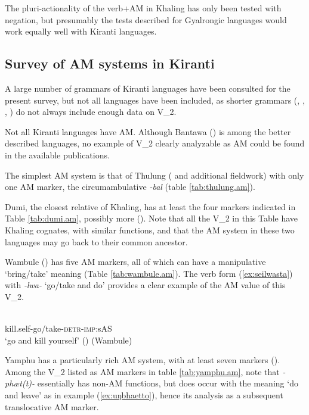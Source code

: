 \documentclass[oneside,a4paper,11pt]{article}
\newcommand{\ipa}[1]{{\phon\textit{#1}}}
\newcommand{\sens}[1]{‘#1’}
\newcommand{\rouge}[1]{{\color{red}#1}}
\begin{document}
 

The pluri-actionality of the verb+AM in Khaling has only been tested with negation, but presumably the tests described for Gyalrongic languages would work equally well with Kiranti languages.

\subsection{Survey of AM systems in Kiranti}

A large number of grammars of Kiranti languages have been consulted for the present survey, but not all languages have been included, as shorter grammars  (\citealt{ebert97athpare}, \citealt{ebert97camling}, \citealt{opgenort05jero}, \citealt{tolsma06kulung}) do not always include enough data on V_2. 

Not all Kiranti languages have AM. Although Bantawa (\citealt{doornenbal09}) is among the better described languages, no example of V_2 clearly analyzable as AM could be found in the available publications.

The simplest AM system is that of Thulung (\citealt{lahaussois02thulung} and additional fieldwork) with only one AM marker, the circumambulative \ipa{-bal} (table \ref{tab:thulung.am}).

Dumi, the closest relative of Khaling, has at least the four markers indicated in Table \ref{tab:dumi.am}, possibly more (\citealt[199-214]{driem93dumi}). Note that all the V_2 in this Table have Khaling cognates, with similar functions, and that the AM system in these two languages may go back to their common ancestor.

Wambule (\citealt{opgenort04wambule}) has five AM markers, all of which can have a manipulative `bring/take' meaning (Table   \ref{tab:wambule.am}). The verb form (\ref{ex:seilwasta}) with  \ipa{-lwa-} `go/take and do' provides a clear example of the AM value of this V_2.
 
\begin{exe}
\ex \label{ex:seilwasta}
\gll \ipa{sei-\rouge{lwa}-s-ta} \\
kill.self-\rouge{go/take}-\textsc{detr}-\textsc{imp}:sAS   \\
\glt \sens{go and kill yourself} (\citealt[439]{opgenort04wambule})  (Wambule)
\end{exe}

Yamphu has a particularly rich AM system, with at least seven markers (\citealt[137-194]{rutgers98yamphu}). Among the V_2 listed as AM markers in table \ref{tab:yamphu.am}, note that \ipa{-phæt(t)-} essentially has non-AM functions, but does occur with the meaning `do and leave' as in example (\ref{ex:uŋbhaetto}), hence its analysis as a subsequent translocative AM marker.  
 
\end{document}
